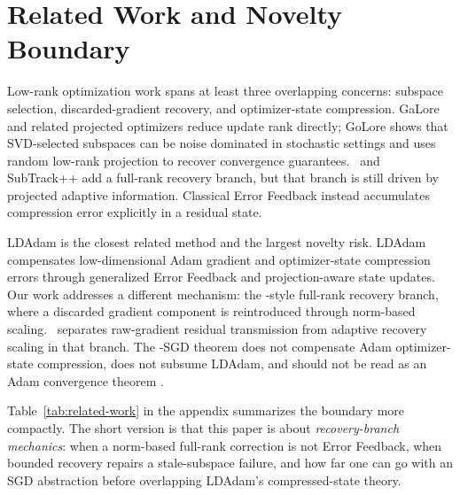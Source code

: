 \section{Related Work and Novelty Boundary}

Low-rank optimization work spans at least three overlapping concerns: subspace
selection, discarded-gradient recovery, and optimizer-state compression. GaLore
and related projected optimizers reduce update rank directly; GoLore shows that
SVD-selected subspaces can be noise dominated in stochastic settings and uses
random low-rank projection to recover convergence guarantees. \Fira\ and
SubTrack++ add a full-rank recovery branch, but that branch is still driven by
projected adaptive information. Classical Error Feedback instead accumulates
compression error explicitly in a residual state.

LDAdam is the closest related method and the largest novelty risk. LDAdam
compensates low-dimensional Adam gradient and optimizer-state compression
errors through generalized Error Feedback and projection-aware state updates.
Our work addresses a different mechanism: the \Fira-style full-rank recovery
branch, where a discarded gradient component is reintroduced through norm-based
scaling. \BECR\ separates raw-gradient residual transmission from adaptive
recovery scaling in that branch. The \BECR-SGD theorem does not compensate Adam
optimizer-state compression, does not subsume LDAdam, and should not be read as
an Adam convergence theorem \citep{ldadam}.

Table~\ref{tab:related-work} in the appendix summarizes the boundary more
compactly. The short version is that this paper is about \emph{recovery-branch
mechanics}: when a norm-based full-rank correction is not Error Feedback, when
bounded recovery repairs a stale-subspace failure, and how far one can go with
an SGD abstraction before overlapping LDAdam's compressed-state theory.
